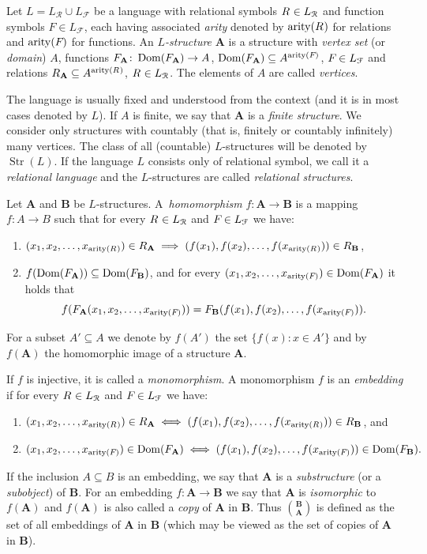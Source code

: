 \documentclass{elsarticle}
\def\dom{\mathop{\mathrm{Dom}}\nolimits}
\def\Str{\mathop{\mathrm{Str}}\nolimits}
\def\str#1{\mathbf {#1}}
\def\arity#1{\mathop{\mathrm{arity}}\nolimits(\rel{}{#1})}
\def\farity#1{\mathop{\mathrm{arity}}\nolimits(\func{}{#1})}
\def\nbrel#1#2{R\ifstrempty{#1}{}{_{#1}}\ifstrempty{#2}{}{^{#2}}}
\def\rel#1#2{\nbrel{\ifstrempty{#1}{}{\str{#1}}}{#2}}
\def\func#1#2{\nbfunc{\ifstrempty{#1}{}{\str{#1}}}{#2}}
\def\nbfunc#1#2{F\ifstrempty{#1}{}{_{#1}}\ifstrempty{#2}{}{^{#2}}}
\theoremstyle{plain}
\theoremstyle{definition}
\theoremstyle{remark}
\begin{document}
Let $L=L_\mathcal R\cup L_\mathcal F$ be a language with relational symbols $\rel{}{}\in L_\mathcal R$ and function symbols $F\in L_\mathcal F$, each having associated \emph{arity} denoted by $\arity{}$ for relations and $\farity{}$ for functions.
An \emph{$L$-structure} $\str{A}$ is a structure with {\em vertex set} (or \emph{domain}) $A$, functions $\func{A}{}\colon \dom(\func{A}{})\to A$, $\dom(\func{A}{})\subseteq A^{\farity{}}$, $\func{}{}\in L_\mathcal F$ and relations $\rel{A}{}\subseteq A^{\arity{}}$, $\rel{}{}\in L_\mathcal R$.
The elements of $A$ are called \emph{vertices}.

 The language is usually fixed and understood from the context (and it is in most cases denoted by $L$).  If $A$ is finite, we say that $\str A$ is a \emph{finite structure}. We consider only structures with countably (that is, finitely or countably infinitely) many vertices.
The class of all (countable) $L$-structures will be denoted by $\Str(L)$.
If the language $L$ consists only of relational symbol, we call it a \emph{relational language} and the $L$-structures are called \emph{relational structures}.

Let $\str{A}$ and $\str{B}$ be $L$-structures.
A~\emph{homomorphism} $f\colon \str{A}\to \str{B}$ is a mapping $f\colon A\to B$ such that  for every $\rel{}{}\in L_\mathcal R$ and $\func{}{}\in L_\mathcal F$ we have:
\begin{enumerate}
\item $(x_1,x_2,\ldots, x_{\arity{}})\in \rel{A}{}\implies (f(x_1),f(x_2),\ldots,f(x_{\arity{}}))\in \rel{B}{}$,
\item $f(\dom(\func{A}{}))\subseteq \dom(\func{B}{})$, and
for every $(x_1,x_2,\allowbreak \ldots, x_{\farity{}})\in \dom(\func{A}{})$ it holds that
$$f(\func{A}{}(x_1,x_2,\allowbreak \ldots, x_{\farity{}}))=\func{B}{}(f(x_1),f(x_2),\ldots,f(x_{\farity{}})).$$
\end{enumerate} For a subset $A'\subseteq A$ we denote by $f(A')$ the set $\{f(x): x\in A'\}$ and by $f(\str{A})$ the homomorphic image of a structure $\str{A}$.

 If $f$ is injective, it is called a \emph{monomorphism}. A monomorphism $f$ is an \emph{embedding} if for every $\rel{}{}\in L_\mathcal R$ and $\func{}{}\in L_\mathcal F$ we have:
\begin{enumerate}
\item $(x_1,x_2,\ldots, x_{\arity{}})\in \rel{A}{}\iff (f(x_1),f(x_2),\ldots,f(x_{\arity{}}))\in \rel{B}{}$, and
\item
$(x_1,x_2,\ldots, x_{\farity{}})\in\dom(\func{A}{}) \iff (f(x_1),f(x_2),\ldots,f(x_{\farity{}}))\in \dom(\func{B}{}).$
\end{enumerate}
  If the inclusion $A\subseteq B$ is an embedding, we say that $\str{A}$ is a \emph{substructure} (or a \emph{subobject}) of $\str{B}$. For an embedding $f\colon\str{A}\to \str{B}$ we say that $\str{A}$ is \emph{isomorphic} to $f(\str{A})$ and $f(\str{A})$ is also called a \emph{copy} of $\str{A}$ in $\str{B}$. Thus $\str{B}\choose \str{A}$ is defined as the set of all embeddings of $\str{A}$ in $\str{B}$ (which may be viewed as the set of copies of $\str{A}$ in $\str{B}$).
\end{document}
